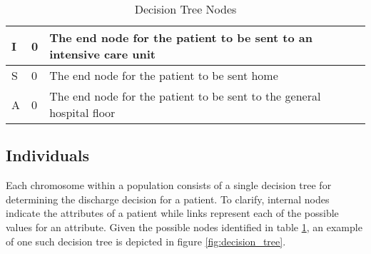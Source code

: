 \begin{table}[H]
{\begin{tabular}{|l|l|l|}
I               & 0              & The end node for the patient to be sent to an intensive care unit                                                                                                                                                                                                                                                                                                                              \\ \hline
S               & 0              & The end node for the patient to be sent home                                                                                                                                                                                                                                                                                                                                                   \\ \hline
A               & 0              & The end node for the patient to be sent to the general hospital floor                                                                                                                                                                                                                                                                                                                          \\ \hline
\end{tabular}}
\caption{Decision Tree Nodes}
\label{tab:nodes}
\end{table}

\subsection{Individuals}\label{sec:individuals}
Each chromosome within a population consists of a single decision tree for determining the discharge decision for a patient. To clarify, internal nodes indicate the attributes of a patient while links represent each of the possible values for an attribute. Given the possible nodes identified in table \ref{tab:nodes}, an example of one such decision tree is depicted in figure \ref{fig:decision_tree}.

\setlength{\GapWidth}{1em}  
\thicklines {}   
\newcommand{\gpbox}[1]{\Ovalbox{#1\rule[-.7ex]{0ex}{2.7ex}}}

